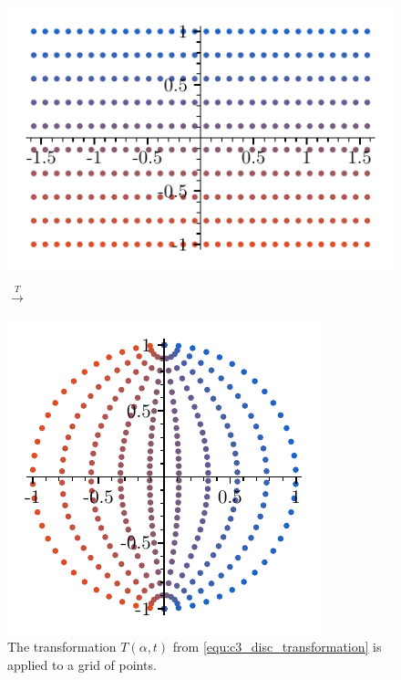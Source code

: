 \begin{figure}
    \begin{center}
        \begin{minipage}{.5\textwidth}
            \includegraphics[width=\textwidth]{img/chapter3/on_disc/disc_original.pdf}%
        \end{minipage}\begin{minipage}{.1\textwidth}\begin{center}
                \Large $ \xrightarrow{T} $
            \end{center}
        \end{minipage}\begin{minipage}{.4\textwidth}
            \includegraphics[width=\textwidth]{img/chapter3/on_disc/disc_transformed.pdf}
        \end{minipage}
    \end{center}
    \caption{The transformation $T(\alpha, t)$ from \eqref{equ:c3_disc_transformation} is applied to a grid of points.}
    \label{fig:c3_disc_transformation}
\end{figure}



